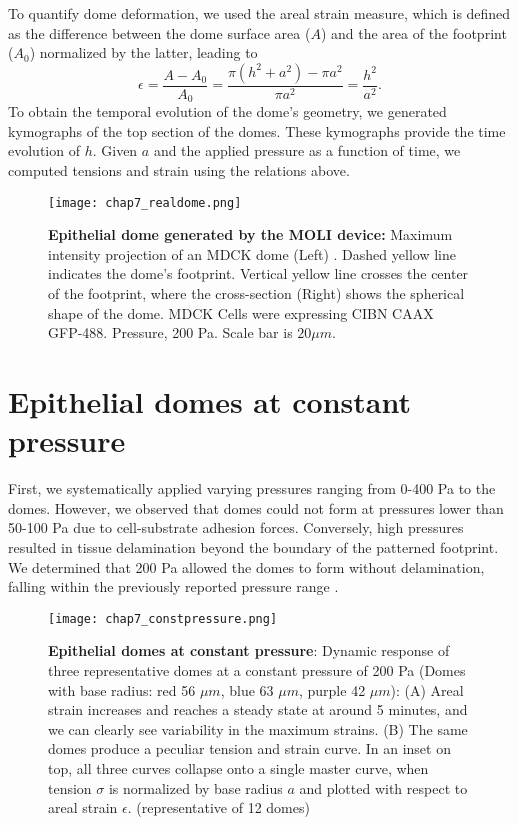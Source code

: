 To quantify dome deformation, we used the areal strain measure, which is defined as the difference between the dome surface area ($A$) and the area of the footprint ($A_{0}$) normalized by the latter, leading to
\begin{equation}
	\label{eqn:arealstrain}
	\epsilon = \frac{A - A_{0}}{A_{0}} = \frac{\pi(h^2 + a^2) - \pi a^2}{\pi a^2} = \frac{h^2}{a^2} .
\end{equation}
To obtain the temporal evolution of the dome’s geometry, we generated kymographs of the top section of the domes. These kymographs provide the time evolution of $h$. Given $a$ and the applied pressure as a function of time, we computed tensions and strain using the relations above.

\begin{figure}
	\centering
	\texttt{[image: chap7\_realdome.png]}
	\caption{\textbf{Epithelial dome generated by the MOLI device:} Maximum intensity projection of an MDCK dome (Left) . Dashed yellow line indicates the dome's footprint. Vertical yellow line crosses the center of the footprint, where the cross-section   (Right) shows the spherical shape of the dome. MDCK Cells were expressing CIBN CAAX GFP-488. Pressure, 200 Pa. Scale bar is $20 \mu m$.
	} \label{fig_7_1}
\end{figure}

\hypertarget{epithelial-domes-at-constant-pressure}{%
	\section{Epithelial domes at constant
		pressure}\label{epithelial-domes-at-constant-pressure}}

First, we systematically applied varying pressures ranging from 0-400 \unit{\pascal} to the domes. However, we observed that domes could not form at pressures lower than 50-100 \unit{\pascal} due to cell-substrate adhesion forces. Conversely, high pressures resulted in tissue delamination beyond the boundary of the patterned footprint. We determined that 200 \unit{\pascal} allowed the domes to form without delamination, falling within the previously reported pressure range \cite{choudhury2022,marin-llaurado2022}.

\begin{figure}[b!]
	\centering
	\texttt{[image: chap7\_constpressure.png]}
	\caption{\label{fig_7_3} \textbf{Epithelial domes at constant pressure}: Dynamic response of three representative domes at a constant pressure of 200 Pa (Domes with base radius: red 56 $\mu m$, blue 63 $\mu m$, purple 42 $\mu m$): (A) Areal strain increases and reaches a steady state at around 5 minutes, and we can clearly see variability in the maximum strains. (B) The same domes produce a peculiar tension and strain curve. In an inset on top, all three curves collapse onto a single  master curve, when tension $\sigma$ is normalized by base radius $a$ and plotted with respect to areal strain $\epsilon$. (representative of 12 domes)
	}
\end{figure}

